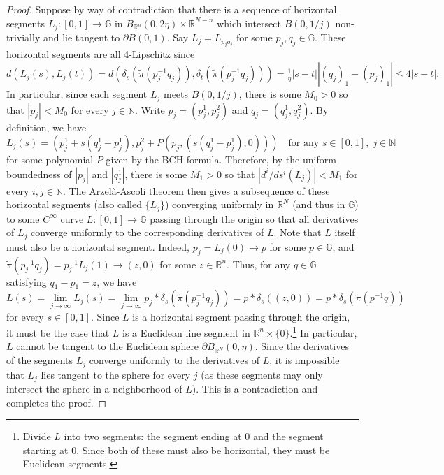 \documentclass[11pt]{amsart}
\theoremstyle{definition}
\numberwithin{theorem}{section} \numberwithin{equation}{section}
\begin{document}
\begin{proof}
Suppose by way of contradiction
that there is a sequence of horizontal segments $L_j:[0,1] \to \mathbb{G}$ 
in $B_{\mathbb{R}^n}(0,2\eta) \times \mathbb{R}^{N-n}$
which intersect $B(0,1/j)$ non-trivially and lie tangent to $\partial B(0,1)$.
Say $L_j = L_{p_jq_j}$ for some $p_j,q_j \in \mathbb{G}$.
These horizontal segments are all 4-Lipschitz since 
$$
d(L_j(s),L_j(t)) 
= d(\delta_s(\tilde{\pi}(p_j^{-1}q_j)),\delta_t(\tilde{\pi}(p_j^{-1}q_j)))
= \tfrac{1}{\eta}|s-t||(q_j)_1 - (p_j)_1|
\leq 4|s-t|.
$$
In particular, 
since each segment $L_j$ meets $B(0,1/j)$,
there is some $M_0>0$ so that $|p_j| < M_0$ for every $j \in \mathbb{N}$.
Write $p_j = (p_j^1,p_j^2)$ and $q_j = (q_j^1,q_j^2)$.
By definition, we have
$$
L_j(s) = \left(p_j^1 + s(q_j^1 - p_j^1), p_j^2 + P\left(p_j,\left(s(q_j^1-p_j^1),0\right) \right) \right)
\quad
\text{for any }
s \in [0,1], \; j \in \mathbb{N}
$$
for some polynomial $P$ given by the BCH formula.
Therefore, by the uniform boundedness of $|p_j|$ and $|q_j^1|$,
there is some $M_1 > 0$ so that $\left| d^i / d s^i (L_j) \right| < M_1$
for every $i,j \in \mathbb{N}$.
The Arzel\`{a}-Ascoli theorem then gives a 
subsequence of these horizontal segments (also called $\{L_j\}$)
converging uniformly in $\mathbb{R}^N$ (and thus in $\mathbb{G}$) to some $C^{\infty}$ curve $L:[0,1] \to \mathbb{G}$
passing through the origin
so that all derivatives of $L_j$ converge uniformly to the corresponding derivatives of $L$.
Note that $L$ itself must also be a horizontal segment.
Indeed, $p_j = L_j(0) \to p$ for some $p \in \mathbb{G}$,
and $\tilde{\pi}(p_j^{-1}q_j) = p_j^{-1} L_j(1) \to (z,0)$ for some $z \in \mathbb{R}^n$.
Thus, for any $q \in \mathbb{G}$ satisfying $q_1 - p_1 = z$, we have
$$
L(s) 
= \lim_{j \to \infty} L_j(s) 
= \lim_{j \to \infty} p_j * \delta_s(\tilde{\pi}(p_j^{-1}q_j)) 
= p * \delta_s((z,0))
= p * \delta_s(\tilde{\pi}(p^{-1}q))
$$
for every $s \in [0,1]$.
Since $L$ is a horizontal segment passing through the origin,
it must be the case that $L$ is a Euclidean line segment in $\mathbb{R}^n \times \{0\}$.\footnote{Divide $L$ 
into two segments: the segment ending at 0 and the segment starting at 0. 
Since both of these must also be horizontal, they must be Euclidean segments.}
In particular, $L$ cannot be tangent to the Euclidean sphere $\partial B_{\mathbb{R}^N}(0,\eta)$.
Since the derivatives of the segments $L_j$ converge uniformly to the derivatives of $L$, 
it is impossible that $L_j$ lies tangent to the sphere for every $j$
(as these segments may only intersect the sphere in a neighborhood of $L$).
This is a contradiction and completes the proof.
\end{proof}
\end{document}

